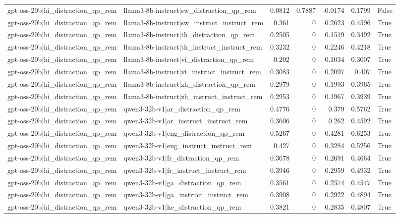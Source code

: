 \begin{table}
\begin{tabular}{l l r r r r l}
gpt-oss-20b|hi_distraction_qp_rem & llama3-8b-instruct|sw_distraction_qp_rem & 0.0812 & 0.7887 & -0.0174 & 0.1799 & False \\
gpt-oss-20b|hi_distraction_qp_rem & llama3-8b-instruct|sw_instruct_instruct_rem & 0.361 & 0 & 0.2623 & 0.4596 & True \\
gpt-oss-20b|hi_distraction_qp_rem & llama3-8b-instruct|th_distraction_qp_rem & 0.2505 & 0 & 0.1519 & 0.3492 & True \\
gpt-oss-20b|hi_distraction_qp_rem & llama3-8b-instruct|th_instruct_instruct_rem & 0.3232 & 0 & 0.2246 & 0.4218 & True \\
gpt-oss-20b|hi_distraction_qp_rem & llama3-8b-instruct|vi_distraction_qp_rem & 0.202 & 0 & 0.1034 & 0.3007 & True \\
gpt-oss-20b|hi_distraction_qp_rem & llama3-8b-instruct|vi_instruct_instruct_rem & 0.3083 & 0 & 0.2097 & 0.407 & True \\
gpt-oss-20b|hi_distraction_qp_rem & llama3-8b-instruct|zh_distraction_qp_rem & 0.2979 & 0 & 0.1993 & 0.3965 & True \\
gpt-oss-20b|hi_distraction_qp_rem & llama3-8b-instruct|zh_instruct_instruct_rem & 0.2953 & 0 & 0.1967 & 0.3939 & True \\
gpt-oss-20b|hi_distraction_qp_rem & qwen3-32b-v1|ar_distraction_qp_rem & 0.4776 & 0 & 0.379 & 0.5762 & True \\
gpt-oss-20b|hi_distraction_qp_rem & qwen3-32b-v1|ar_instruct_instruct_rem & 0.3606 & 0 & 0.262 & 0.4592 & True \\
gpt-oss-20b|hi_distraction_qp_rem & qwen3-32b-v1|eng_distraction_qp_rem & 0.5267 & 0 & 0.4281 & 0.6253 & True \\
gpt-oss-20b|hi_distraction_qp_rem & qwen3-32b-v1|eng_instruct_instruct_rem & 0.427 & 0 & 0.3284 & 0.5256 & True \\
gpt-oss-20b|hi_distraction_qp_rem & qwen3-32b-v1|fr_distraction_qp_rem & 0.3678 & 0 & 0.2691 & 0.4664 & True \\
gpt-oss-20b|hi_distraction_qp_rem & qwen3-32b-v1|fr_instruct_instruct_rem & 0.3946 & 0 & 0.2959 & 0.4932 & True \\
gpt-oss-20b|hi_distraction_qp_rem & qwen3-32b-v1|ga_distraction_qp_rem & 0.3561 & 0 & 0.2574 & 0.4547 & True \\
gpt-oss-20b|hi_distraction_qp_rem & qwen3-32b-v1|ga_instruct_instruct_rem & 0.3908 & 0 & 0.2922 & 0.4894 & True \\
gpt-oss-20b|hi_distraction_qp_rem & qwen3-32b-v1|he_distraction_qp_rem & 0.3821 & 0 & 0.2835 & 0.4807 & True \\

\end{tabular}
\end{table}
